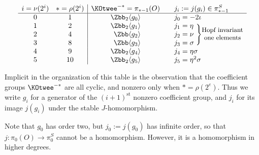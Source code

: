 \[
\begin{array}{cc|ccl}
i=\nu(2^i) & *=\rho(2^i) & \KOtwee^{-*}=\pi_{*-1}(O) &&j_i:=j(g_i)\in\pi_{*-1}^S \\
\hline
0 & 1 & {\Zbb_2 \anglebrace{g_0}} && j_0=-2 \iota \\
1 & 2 & {\Zbb_2 \anglebrace{g_1}} && j_1=\eta \\
2 & 4 & {\phantom{_2}\Zbb \anglebrace{g_2}} && j_2=\nu\ %
\smash{\Biggr \}
\raisebox{-1.1ex}{\small\shortstack{Hopf invariant\\one elements}}}\\
3 & 8 & {\phantom{_2}\Zbb \anglebrace{g_3}} && j_3=\sigma \\
4 & 9 & {\Zbb_2 \anglebrace{g_4}} && j_4=\eta \sigma \\
5 & 10 & {\Zbb_2 \anglebrace{g_5}} && j_5=\eta^2 \sigma
\end{array}
\]

Implicit in the organization of this table is the observation that the coefficient groups $\KOtwee^{-*}$ are all cyclic, and nonzero only when $*=\rho(2^e)$. Thus we write $g_i$ for a generator of the $(i+1)^\text{st}$ nonzero coefficient group, and $j_i$ for its image $j(g_i)$ under the stable $J$-homomorphism.

Note that $g_0$ has order two, but $j_0:=j(g_0)$ has infinite order, so that $j:\pi_0(O)\to\pi^S_0$ cannot be a homomorphism. However, it is a homomorphism in higher degrees.

